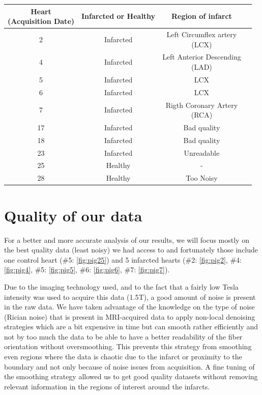 \begin{center}
    \begin{tabular}{|c | c | c | c|} 
         \hline
         \shortstack{Heart \\ (Acquisition Date)} & Infarcted or Healthy & Region of infarct \\
         \hline
         2 & Infarcted & \shortstack{Left Circumflex artery \\ (LCX)} \\ 
         \hline
         4 & Infarcted & \shortstack{Left Anterior Descending \\ (LAD)} \\
         \hline
         5 & Infarcted & LCX \\
         \hline
         6 & Infarcted & LCX \\
         \hline
         7 & Infarcted & \shortstack{Rigth Coronary Artery \\ (RCA)} \\ 
         \hline
         17 & Infarcted & Bad quality \\
         \hline
         18 & Infarcted & Bad quality \\
         \hline
         23 & Infarcted & Unreadable \\
         \hline
         25 & Healthy & - \\
         \hline
         28 & Healthy & Too Noisy \\
         \hline
    \end{tabular}
\end{center}

\section{Quality of our data}

For a better and more accurate analysis of our results, we will focus mostly on the best quality data (least noisy) we had access to and fortunately those include one control heart (\#5: \ref{fig:pig25}) and 5 infarcted hearts (\#2: \ref{fig:pig2}, \#4: \ref{fig:pig4}, \#5: \ref{fig:pig5}, \#6: \ref{fig:pig6}, \#7: \ref{fig:pig7}).

Due to the imaging technology used, and to the fact that a fairly low Tesla intensity was used to acquire this data (1.5T), a good amount of noise is present in the raw data. We have taken advantage of the knowledge on the type of noise (Rician noise) that is present in MRI-acquired data to apply non-local denoising strategies which are a bit expensive in time but can smooth rather efficiently and not by too much the data to be able to have a better readability of the fiber orientation without oversmoothing. This prevents this strategy from smoothing even regions where the data is chaotic due to the infarct or proximity to the boundary and not only because of noise issues from acquisition. A fine tuning of the smoothing strategy allowed us to get good quality datasets without removing relevant information in the regions of interest around the infarcts.

